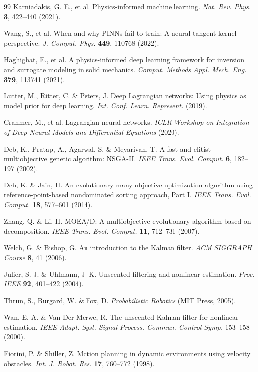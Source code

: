 \documentclass[pdflatex,sn-nature]{sn-jnl}%
\begin{document}
\begin{thebibliography}{99}
Karniadakis, G. E., et al. Physics-informed machine learning. \textit{Nat. Rev. Phys.} \textbf{3}, 422--440 (2021).

Wang, S., et al. When and why PINNs fail to train: A neural tangent kernel perspective. \textit{J. Comput. Phys.} \textbf{449}, 110768 (2022).

Haghighat, E., et al. A physics-informed deep learning framework for inversion and surrogate modeling in solid mechanics. \textit{Comput. Methods Appl. Mech. Eng.} \textbf{379}, 113741 (2021).

Lutter, M., Ritter, C. \& Peters, J. Deep Lagrangian networks: Using physics as model prior for deep learning. \textit{Int. Conf. Learn. Represent.} (2019).

Cranmer, M., et al. Lagrangian neural networks. \textit{ICLR Workshop on Integration of Deep Neural Models and Differential Equations} (2020).

Deb, K., Pratap, A., Agarwal, S. \& Meyarivan, T. A fast and elitist multiobjective genetic algorithm: NSGA-II. \textit{IEEE Trans. Evol. Comput.} \textbf{6}, 182--197 (2002).

Deb, K. \& Jain, H. An evolutionary many-objective optimization algorithm using reference-point-based nondominated sorting approach, Part I. \textit{IEEE Trans. Evol. Comput.} \textbf{18}, 577--601 (2014).

Zhang, Q. \& Li, H. MOEA/D: A multiobjective evolutionary algorithm based on decomposition. \textit{IEEE Trans. Evol. Comput.} \textbf{11}, 712--731 (2007).

Welch, G. \& Bishop, G. An introduction to the Kalman filter. \textit{ACM SIGGRAPH Course} \textbf{8}, 41 (2006).

Julier, S. J. \& Uhlmann, J. K. Unscented filtering and nonlinear estimation. \textit{Proc. IEEE} \textbf{92}, 401--422 (2004).

Thrun, S., Burgard, W. \& Fox, D. \textit{Probabilistic Robotics} (MIT Press, 2005).

Wan, E. A. \& Van Der Merwe, R. The unscented Kalman filter for nonlinear estimation. \textit{IEEE Adapt. Syst. Signal Process. Commun. Control Symp.} 153--158 (2000).

Fiorini, P. \& Shiller, Z. Motion planning in dynamic environments using velocity obstacles. \textit{Int. J. Robot. Res.} \textbf{17}, 760--772 (1998).


\end{thebibliography}
\end{document}
